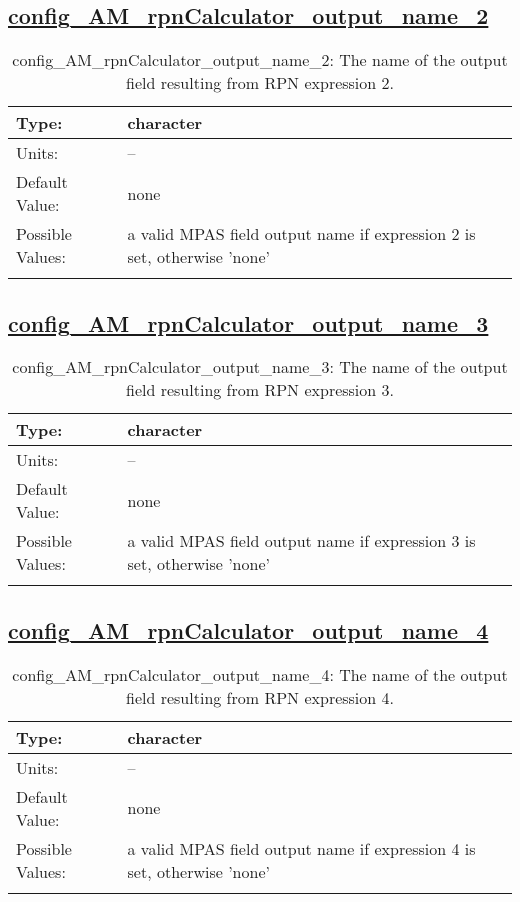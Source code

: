 \subsection[config\_AM\_rpnCalculator\_output\_name\_2]{\hyperref[sec:nm_tab_AM_rpnCalculator]{config\_AM\_rpnCalculator\_output\_name\_2}}
\label{subsec:nm_sec_config_AM_rpnCalculator_output_name_2}
\begin{center}
\begin{longtable}{| p{2.0in} || p{4.0in} |}
    \hline
    Type: & character \\
    \hline
    Units: & -- \\
    \hline
    Default Value: & none \\
    \hline
    Possible Values: & a valid MPAS field output name if expression 2 is set, otherwise 'none' \\
    \hline
    \caption{config\_AM\_rpnCalculator\_output\_name\_2: The name of the output field resulting from RPN expression 2.}
\end{longtable}
\end{center}
\subsection[config\_AM\_rpnCalculator\_output\_name\_3]{\hyperref[sec:nm_tab_AM_rpnCalculator]{config\_AM\_rpnCalculator\_output\_name\_3}}
\label{subsec:nm_sec_config_AM_rpnCalculator_output_name_3}
\begin{center}
\begin{longtable}{| p{2.0in} || p{4.0in} |}
    \hline
    Type: & character \\
    \hline
    Units: & -- \\
    \hline
    Default Value: & none \\
    \hline
    Possible Values: & a valid MPAS field output name if expression 3 is set, otherwise 'none' \\
    \hline
    \caption{config\_AM\_rpnCalculator\_output\_name\_3: The name of the output field resulting from RPN expression 3.}
\end{longtable}
\end{center}
\subsection[config\_AM\_rpnCalculator\_output\_name\_4]{\hyperref[sec:nm_tab_AM_rpnCalculator]{config\_AM\_rpnCalculator\_output\_name\_4}}
\label{subsec:nm_sec_config_AM_rpnCalculator_output_name_4}
\begin{center}
\begin{longtable}{| p{2.0in} || p{4.0in} |}
    \hline
    Type: & character \\
    \hline
    Units: & -- \\
    \hline
    Default Value: & none \\
    \hline
    Possible Values: & a valid MPAS field output name if expression 4 is set, otherwise 'none' \\
    \hline
    \caption{config\_AM\_rpnCalculator\_output\_name\_4: The name of the output field resulting from RPN expression 4.}
\end{longtable}
\end{center}
